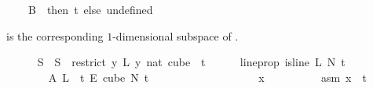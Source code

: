 \begin{isabellebody}
\ \ \ \ B\ {}\ then\ t\ else\ undefined{\isacharparenright}{\kern0pt}{\isacharparenright}{\kern0pt}{\isacharparenright}{\kern0pt}{\isachardoublequoteclose}%
\begin{isamarkuptext}%
 is the corresponding $1$-dimensional subspace of .%
\end{isamarkuptext}\isamarkuptrue%
\ \ \ \ \isamarkupfalse%
\ S{}\ \ {\isachardoublequoteopen}S{}\ {\isasymequiv}\ restrict\ {\isacharparenleft}{\kern0pt}{\isasymlambda}y{\isachardot}{\kern0pt}\ L{\isacharprime}{\kern0pt}\ {\isacharparenleft}{\kern0pt}y\ {\isacharparenleft}{\kern0pt}{}{\isacharcolon}{\kern0pt}{\isacharcolon}{\kern0pt}nat{\isacharparenright}{\kern0pt}{\isacharparenright}{\kern0pt}{\isacharparenright}{\kern0pt}\ {\isacharparenleft}{\kern0pt}cube\ {}\ {\isacharparenleft}{\kern0pt}t{\isacharplus}{\kern0pt}{}{\isacharparenright}{\kern0pt}{\isacharparenright}{\kern0pt}{\isachardoublequoteclose}\isanewline
\ \ \ \ \isamarkupfalse%
\ line{\isacharunderscore}{\kern0pt}prop{\isacharcolon}{\kern0pt}\ {\isachardoublequoteopen}is{\isacharunderscore}{\kern0pt}line\ L{\isacharprime}{\kern0pt}\ N{\isacharprime}{\kern0pt}\ {\isacharparenleft}{\kern0pt}t\ {\isacharplus}{\kern0pt}\ {}{\isacharparenright}{\kern0pt}{\isachardoublequoteclose}\isanewline
\ \ \ \ \isamarkupfalse%
{\isacharminus}{\kern0pt}\isanewline
\ \ \ \ \ \ \isamarkupfalse%
\ A{}{\isacharcolon}{\kern0pt}\ {\isachardoublequoteopen}L{\isacharprime}{\kern0pt}\ {\isasymin}\ {\isacharbraceleft}{\kern0pt}{\isachardot}{\kern0pt}{\isachardot}{\kern0pt}{\isacharless}{\kern0pt}t{\isacharplus}{\kern0pt}{}{\isacharbraceright}{\kern0pt}\ {\isasymrightarrow}\isactrlsub E\ cube\ N{\isacharprime}{\kern0pt}\ {\isacharparenleft}{\kern0pt}t\ {\isacharplus}{\kern0pt}\ {}{\isacharparenright}{\kern0pt}{\isachardoublequoteclose}\ \isanewline
\ \ \ \ \ \ \isamarkupfalse%
\isanewline
\ \ \ \ \ \ \ \ \isamarkupfalse%
\ x\isanewline
\ \ \ \ \ \ \ \ \isamarkupfalse%
\ asm{\isacharcolon}{\kern0pt}\ {\isachardoublequoteopen}x\ {\isasymin}\ {\isacharbraceleft}{\kern0pt}{\isachardot}{\kern0pt}{\isachardot}{\kern0pt}{\isacharless}{\kern0pt}t\ {\isacharplus}{\kern0pt}\ {}{\isacharbraceright}{\kern0pt}{\isachardoublequoteclose}\isanewline
\ \ \ \ \ \ \ \ \isamarkupfalse%
\ \isamarkupfalse%

\end{isabellebody}
